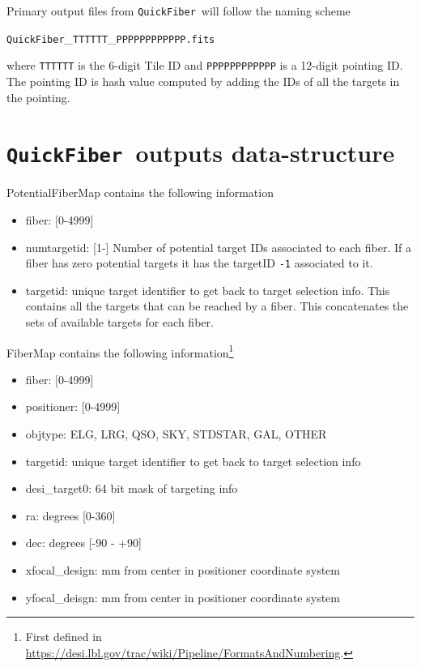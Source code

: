 \documentclass{article}
\newcommand{\code}{{\texttt{QuickFiber}}}
\begin{document}
Primary output files from \code\ will follow the naming scheme

\begin{center}
\code\_{\texttt{TTTTTT}}\_{\texttt{PPPPPPPPPPPP.fits}}
\end{center}
\noindent
where \texttt{TTTTTT} is the 6-digit Tile ID and \texttt{PPPPPPPPPPPP} is
a 12-digit pointing ID. The pointing ID is hash value computed by
adding the IDs of all the targets in the pointing. 

\section{\code\ outputs data-structure}


PotentialFiberMap contains the following information
\begin{itemize}
\item fiber: [0-4999]
\item numtargetid: [1-] Number of potential target IDs associated to each
  fiber. If a fiber has zero potential targets it has the
  targetID \texttt{-1} associated to it. 
\item targetid:  unique target identifier to get back to target
      selection info. This contains  all the targets that can be
      reached by a fiber. This concatenates the sets of available
      targets for each fiber.
\end{itemize}

\noindent
FiberMap contains the following information\footnote{First defined in
  \url{https://desi.lbl.gov/trac/wiki/Pipeline/FormatsAndNumbering}.} 
\begin{itemize}
    \item fiber: [0-4999]
    \item positioner: [0-4999]
    \item objtype: ELG, LRG, QSO, SKY, STDSTAR, GAL, OTHER
    \item targetid: 
      unique target identifier to get back to target
      selection info 
    \item desi\_target0: 64 bit mask of targeting info 
    \item ra: degrees [0-360] 
    \item dec: degrees [-90 - +90] 
    \item xfocal\_design: mm from center in positioner coordinate system 
    \item yfocal\_deisgn: mm from center in positioner coordinate system  
\end{itemize}
\end{document}

